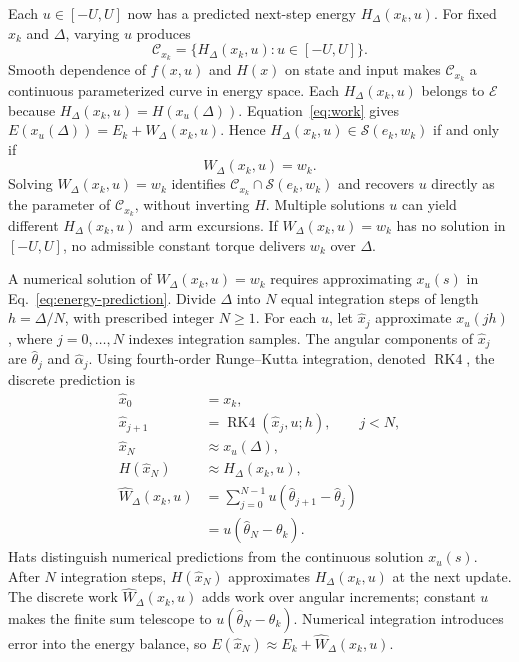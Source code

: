 \documentclass[letterpaper,10pt,conference]{ieeeconf}
\begin{document}
Each $u\in[-U,U]$ now has a predicted next-step energy $H_\Delta(x_k,u)$. For fixed $x_k$ and $\Delta$, varying $u$ produces
\begin{equation}
 \mathcal C_{x_k}=\{H_\Delta(x_k,u):u\in[-U,U]\}.
 \label{eq:curve}
\end{equation}
Smooth dependence of $f(x,u)$ and $H(x)$ on state and input makes $\mathcal C_{x_k}$ a continuous parameterized curve in energy space. Each $H_\Delta(x_k,u)$ belongs to $\mathcal E$ because $H_\Delta(x_k,u)=H(x_u(\Delta))$. Equation~\eqref{eq:work} gives $E(x_u(\Delta))=E_k+W_\Delta(x_k,u)$. Hence $H_\Delta(x_k,u)\in\mathcal S(e_k,w_k)$ if and only if
\[
 W_\Delta(x_k,u)=w_k.
\]
Solving $W_\Delta(x_k,u)=w_k$ identifies $\mathcal C_{x_k}\cap\mathcal S(e_k,w_k)$ and recovers $u$ directly as the parameter of $\mathcal C_{x_k}$, without inverting $H$. Multiple solutions $u$ can yield different $H_\Delta(x_k,u)$ and arm excursions. If $W_\Delta(x_k,u)=w_k$ has no solution in $[-U,U]$, no admissible constant torque delivers $w_k$ over $\Delta$.

A numerical solution of $W_\Delta(x_k,u)=w_k$ requires approximating $x_u(s)$ in Eq.~\eqref{eq:energy-prediction}. Divide $\Delta$ into $N$ equal integration steps of length $h=\Delta/N$, with prescribed integer $N\ge1$. For each $u$, let $\widehat x_j$ approximate $x_u(jh)$, where $j=0,\ldots,N$ indexes integration samples. The angular components of $\widehat x_j$ are $\widehat\theta_j$ and $\widehat\alpha_j$. Using fourth-order Runge--Kutta integration, denoted $\operatorname{RK4}$, the discrete prediction is
\begin{equation}
\begin{aligned}
 \widehat x_0&=x_k,\\
 \widehat x_{j+1}&=\operatorname{RK4}(\widehat x_j,u;h),\qquad j<N,\\
 \widehat x_N&\approx x_u(\Delta),\\
 H(\widehat x_N)&\approx H_\Delta(x_k,u),\\
 \widehat W_\Delta(x_k,u)&=\sum_{j=0}^{N-1}u(\widehat\theta_{j+1}-\widehat\theta_j)\\
 &=u(\widehat\theta_N-\theta_k).
\end{aligned}
\label{eq:state-prediction}
\end{equation}
Hats distinguish numerical predictions from the continuous solution $x_u(s)$. After $N$ integration steps, $H(\widehat x_N)$ approximates $H_\Delta(x_k,u)$ at the next update. The discrete work $\widehat W_\Delta(x_k,u)$ adds work over angular increments; constant $u$ makes the finite sum telescope to $u(\widehat\theta_N-\theta_k)$. Numerical integration introduces error into the energy balance, so $E(\widehat x_N)\approx E_k+\widehat W_\Delta(x_k,u)$.
\end{document}

